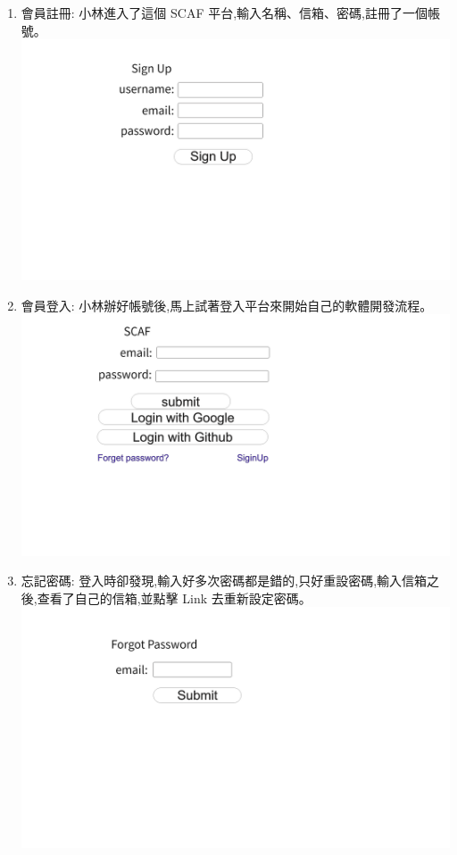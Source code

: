 \documentclass{report}
\begin{document}
\begin{enumerate}[label=(\Alph*)]
  \item 會員註冊: 小林進入了這個 SCAF 平台,輸入名稱、信箱、密碼,註冊了一個帳號。 \\
  \includegraphics[width=\textwidth]{assets/wireframe/sign_up.png}
  \item 會員登入: 小林辦好帳號後,馬上試著登入平台來開始自己的軟體開發流程。 \\
  \includegraphics[width=\textwidth]{assets/wireframe/Login.png}
  \item 忘記密碼: 登入時卻發現,輸入好多次密碼都是錯的,只好重設密碼,輸入信箱之後,查看了自己的信箱,並點擊 Link 去重新設定密碼。\\
  \includegraphics[width=\textwidth]{assets/wireframe/forgot_password.png}

\end{enumerate}
\end{document}
